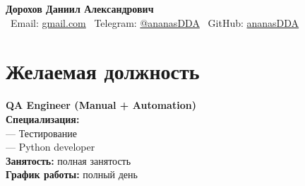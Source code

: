 \documentclass[a4paper,11pt]{article}
\begin{document}
\begin{center}
  {\Huge\textbf{Дорохов Даниил Александрович}}\\[0.3cm]
  \faEnvelope\ Email: \href{mailto:doroshov.daniil69@gmail.com}{gmail.com} \quad
  \faEnvelope\ Telegram: \href{https://t.me/@ananasDDA}{@ananasDDA} \quad
  \faGithub\ GitHub: \href{https://github.com/ananasDDA}{ananasDDA}
\end{center}

\section{Желаемая должность}
\textbf{QA Engineer (Manual + Automation)}\\
\textbf{Специализация:}\\
— Тестирование\\
— Python developer\\

\textbf{Занятость:} полная занятость\\
\textbf{График работы:} полный день

\end{document}
